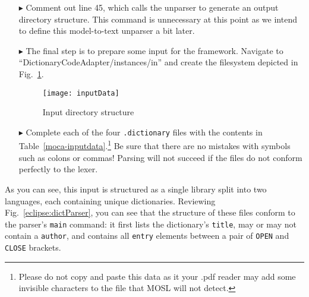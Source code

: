 \begin{itemize}

\item[$\blacktriangleright$] Comment out line 45, which calls the unparser to generate an output directory structure. This command is unnecessary at this point
as we intend to define this model-to-text unparser a bit later. 

\newpage

\item[$\blacktriangleright$] The final step is to prepare some input for the framework. Navigate to ``DictionaryCodeAdapter/instances/in'' and create the
filesystem depicted in Fig.~\ref{eclipse:textDirectory}. 

\vspace{1cm}

\begin{figure}[htp]
\begin{center}
  \texttt{[image: inputData]}
  \caption{Input directory structure}
  \label{eclipse:textDirectory}
\end{center}
\end{figure}

\vspace{1cm}

\item[$\blacktriangleright$] Complete each of the four \texttt{.dictionary} files with the contents in Table~\ref{moca-inputdata}.\footnote{Please do not
copy and paste this data as it your .pdf reader may add some invisible characters to the file that MOSL will not detect.} Be sure that there are no mistakes
with symbols such as colons or commas! Parsing will not succeed if the files do not conform perfectly to the lexer. 

\end{itemize}

As you can see, this input is structured as a single library split into two languages, each containing unique dictionaries. Reviewing
Fig.~\ref{eclipse:dictParser}, you can see that the structure of these files conform to the parser's \texttt{main} command: it first lists the dictionary's
\texttt{title}, may or may not contain a \texttt{author}, and contains all \texttt{entry} elements between a pair of \texttt{OPEN} and \texttt{CLOSE} brackets.

